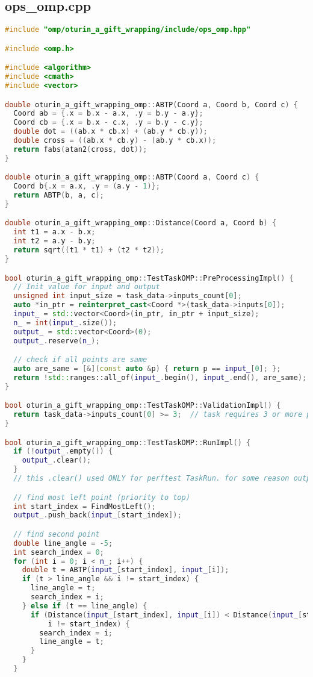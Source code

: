 \documentclass[12pt,a4paper]{extarticle}
\begin{document}
\subsection{ops\_omp.cpp}
\label{sec:omp.cpp}
\begin{lstlisting}[language=C++]
#include "omp/oturin_a_gift_wrapping/include/ops_omp.hpp"

#include <omp.h>

#include <algorithm>
#include <cmath>
#include <vector>

double oturin_a_gift_wrapping_omp::ABTP(Coord a, Coord b, Coord c) {
  Coord ab = {.x = b.x - a.x, .y = b.y - a.y};
  Coord cb = {.x = b.x - c.x, .y = b.y - c.y};
  double dot = ((ab.x * cb.x) + (ab.y * cb.y));
  double cross = ((ab.x * cb.y) - (ab.y * cb.x));
  return fabs(atan2(cross, dot));
}

double oturin_a_gift_wrapping_omp::ABTP(Coord a, Coord c) {
  Coord b{.x = a.x, .y = (a.y - 1)};
  return ABTP(b, a, c);
}

double oturin_a_gift_wrapping_omp::Distance(Coord a, Coord b) {
  int t1 = a.x - b.x;
  int t2 = a.y - b.y;
  return sqrt((t1 * t1) + (t2 * t2));
}

bool oturin_a_gift_wrapping_omp::TestTaskOMP::PreProcessingImpl() {
  // Init value for input and output
  unsigned int input_size = task_data->inputs_count[0];
  auto *in_ptr = reinterpret_cast<Coord *>(task_data->inputs[0]);
  input_ = std::vector<Coord>(in_ptr, in_ptr + input_size);
  n_ = int(input_.size());
  output_ = std::vector<Coord>(0);
  output_.reserve(n_);

  // check if all points are same
  auto are_same = [&](const auto &p) { return p == input_[0]; };
  return !std::ranges::all_of(input_.begin(), input_.end(), are_same);
}

bool oturin_a_gift_wrapping_omp::TestTaskOMP::ValidationImpl() {
  return task_data->inputs_count[0] >= 3;  // task requires 3 or more points to wrap
}

bool oturin_a_gift_wrapping_omp::TestTaskOMP::RunImpl() {
  if (!output_.empty()) {
    output_.clear();
  }
  // this .clear() used ONLY for perftest TaskRun. for some reason output_ has something in it

  // find most left point (priority to top)
  int start_index = FindMostLeft();
  output_.push_back(input_[start_index]);

  // find second point
  double line_angle = -5;
  int search_index = 0;
  for (int i = 0; i < n_; i++) {
    double t = ABTP(input_[start_index], input_[i]);
    if (t > line_angle && i != start_index) {
      line_angle = t;
      search_index = i;
    } else if (t == line_angle) {
      if (Distance(input_[start_index], input_[i]) < Distance(input_[start_index], input_[search_index]) &&
          i != start_index) {
        search_index = i;
        line_angle = t;
      }
    }
  }


\end{lstlisting}
\end{document}
